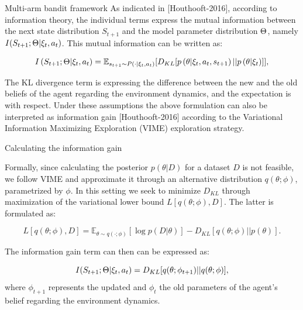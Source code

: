 \documentclass[final]{beamer}
\newlength{\onecolwid}
\begin{document}
\begin{frame}[t]
\begin{columns}[t]
\begin{column}{\onecolwid}
\begin{block}{Multi-arm bandit framework}
As indicated in [Houthooft-2016], according to information theory, the individual terms express the mutual information between the next state distribution $S_{t+1}$ 
and the model parameter distribution $\bold\mathbf{\Theta}$, namely $I(S_{t+1}; \bold\mathbf{\Theta}|\xi_{t},a_{t})$. This mutual information can be written as:

\begin{equation}
       I \left (S_{t+1};\bold\mathbf{\Theta}|\xi_{t},a_{t} \right) = \mathbb{E}_{s_{t+1} \sim P \left(\cdot|\xi_{t},a_{t} \right)} [D_{KL}[p \left(\theta|\xi_{t},a_t,s_{t+1}\right) || p \left(\theta|\xi_{t} \right)]], \label{eq:2}
\end{equation}

\vspace*{0.5cm}

The KL divergence term is expressing the difference between the new and the old beliefs of the agent regarding the environment dynamics, and the expectation is with respect. Under these assumptions the above formulation can also be interpreted as information gain [Houthooft-2016] according to the Variational Information Maximizing Exploration (VIME) exploration strategy.


\end{block}
\vspace*{-0.5cm}
\begin{block}{Calculating the information gain}

Formally, since calculating the posterior $p(\theta|D)$ for a dataset $D$ is not feasible, we follow VIME and approximate it through an alternative distribution $q(\theta;\phi)$, parametrized by $\phi$. In this setting we seek to minimize $D_{KL}$ through maximization of the variational lower bound $L[q(\theta ; \phi),D]$. The latter is formulated as:

\begin{equation}
        L[q(\theta ; \phi),D] =  \mathbb{E}_{\theta \sim q(\cdot ; \phi)} [\log p(D|\theta)] - D_{KL}[q(\theta ; \phi) || p(\theta)]. \label{eq:3}
\end{equation}

The information gain term can then can be expressed as:


\begin{equation}
       I(S_{t+1}; \bold\mathbf{\Theta}|\xi_{t},a_{t}) = D_{KL} [q(\theta ; \phi_{t+1}) || q(\theta ; \phi)], \label{eq:4}
\end{equation}
where $\phi_{t+1}$ represents the updated and $\phi_{t}$ the old parameters of the agent's belief regarding the environment dynamics.


\end{block}
\end{column}
\end{columns}
\end{frame}
\end{document}
